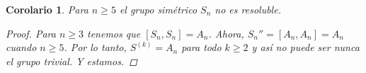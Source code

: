 \documentclass[12pt]{book}
\newtheorem{cor}[teo]{Corolario}
\theoremstyle{definition}
\begin{document}
\begin{cor}
Para $n\geq 5$ el grupo simétrico $S_n$ no es resoluble.
\begin{proof}
Para $n\geq 3$ tenemos que $[S_n,S_n]=A_n$. Ahora, $S_n'' = [A_n,A_n] = A_n$ cuando $n\geq 5$. Por lo tanto, $S^{(k)}=A_n$ para todo $k\geq 2$ y así no puede ser nunca el grupo trivial. Y estamos.
\end{proof}
\end{cor}
\end{document}
